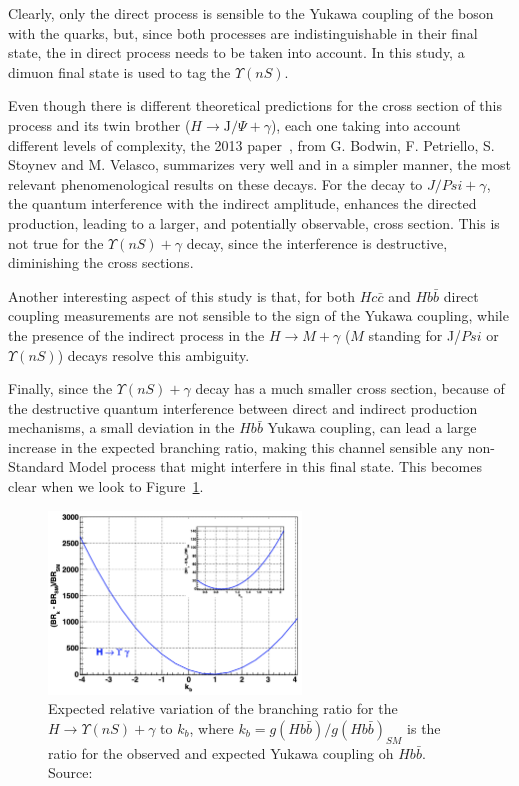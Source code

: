 Clearly, only the direct process is sensible to the Yukawa coupling of the boson with the quarks, but, since both processes are indistinguishable in their final state, the in direct process needs to be taken into account. In this study, a dimuon final state is used to tag the $\Upsilon(nS)$.

Even though there is different theoretical predictions for the cross section of this process and its twin brother ($H \rightarrow \text{J/}\Psi + \gamma$), each one taking into account different levels of complexity, the 2013 paper~\cite{PhysRevD.88.053003}, from G. Bodwin, F. Petriello, S. Stoynev and M. Velasco, summarizes very well and in a simpler manner, the most relevant phenomenological results on these decays. For the decay to $J/Psi + \gamma$, the quantum interference with the indirect amplitude, enhances the directed production, leading to a larger, and potentially observable, cross section. This is not true for the $\Upsilon(nS) + \gamma$ decay, since the interference is destructive, diminishing the cross sections. 

Another interesting aspect of this study is that, for both $Hc\bar{c}$ and $Hb\bar{b}$ direct coupling measurements are not sensible to the sign of the Yukawa coupling, while the presence of the indirect process in the $H \rightarrow M + \gamma$ ($M$ standing for J/$Psi$ or $\Upsilon(nS)$) decays resolve this ambiguity.

Finally, since the $\Upsilon(nS) + \gamma$ decay has a much smaller cross section, because of the destructive quantum interference between direct and indirect production mechanisms, a small deviation in the $Hb\bar{b}$ Yukawa coupling, can lead a large increase in the expected branching ratio, making this channel sensible any non-Standard Model process that might interfere in this final state. This becomes clear when we look to Figure~\ref{hbb_coup}.

\begin{figure}[!htbp]
  \begin{center}
    \includegraphics[width=0.6\textwidth ]{figures_and_tables/theory/hbb_coup.png}
  \end{center}\vspace*{-.5cm}
  \caption{Expected relative variation of the branching ratio for the $H \rightarrow \Upsilon(nS) + \gamma$ to $k_b$, where $k_b = g(Hb\bar{b})/g(Hb\bar{b})_{SM}$ is the ratio for the observed and expected Yukawa coupling oh $Hb\bar{b}$. Source:~\cite{PhysRevD.88.053003}}
  \label{hbb_coup}
\end{figure}


